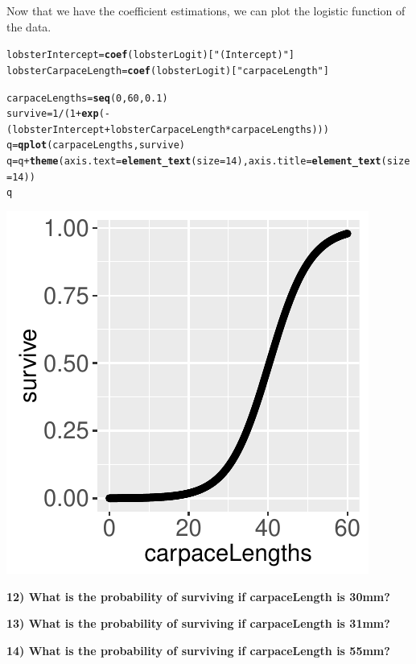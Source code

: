 \documentclass{article}\usepackage[]{graphicx}\usepackage[]{color}
\makeatletter
\newcommand{\hlnum}[1]{\textcolor[rgb]{0.686,0.059,0.569}{#1}}%
\newcommand{\hlstr}[1]{\textcolor[rgb]{0.192,0.494,0.8}{#1}}%
\newcommand{\hlopt}[1]{\textcolor[rgb]{0,0,0}{#1}}%
\newcommand{\hlstd}[1]{\textcolor[rgb]{0.345,0.345,0.345}{#1}}%
\newcommand{\hlkwb}[1]{\textcolor[rgb]{0.69,0.353,0.396}{#1}}%
\newcommand{\hlkwc}[1]{\textcolor[rgb]{0.333,0.667,0.333}{#1}}%
\newcommand{\hlkwd}[1]{\textcolor[rgb]{0.737,0.353,0.396}{\textbf{#1}}}%
\newenvironment{kframe}{%
 \def\at@end@of@kframe{}%
 \ifinner\ifhmode%
  \def\at@end@of@kframe{\end{minipage}}%
  \begin{minipage}{\columnwidth}%
 \fi\fi%
 \def\FrameCommand##1{\hskip\@totalleftmargin \hskip-\fboxsep
 \colorbox{shadecolor}{##1}\hskip-\fboxsep
     \hskip-\linewidth \hskip-\@totalleftmargin \hskip\columnwidth}%
 \MakeFramed {\advance\hsize-\width
   \@totalleftmargin\z@ \linewidth\hsize
   \@setminipage}}%
 {\par\unskip\endMakeFramed%
 \at@end@of@kframe}
\newenvironment{knitrout}{}{} %
\makeatother
\begin{document}
Now that we have the coefficient estimations, we can plot the logistic function of the data.

\begin{knitrout}
\color{fgcolor}\begin{kframe}
\begin{alltt}
\hlstd{lobsterIntercept} \hlkwb{=} \hlkwd{coef}\hlstd{(lobsterLogit)[}\hlstr{"(Intercept)"}\hlstd{]}
\hlstd{lobsterCarpaceLength} \hlkwb{=} \hlkwd{coef}\hlstd{(lobsterLogit)[}\hlstr{"carpaceLength"}\hlstd{]}

\hlstd{carpaceLengths} \hlkwb{=} \hlkwd{seq}\hlstd{(}\hlnum{0}\hlstd{,}\hlnum{60}\hlstd{,}\hlnum{0.1}\hlstd{)}
\hlstd{survive} \hlkwb{=} \hlnum{1}\hlopt{/}\hlstd{(}\hlnum{1}\hlopt{+}\hlkwd{exp}\hlstd{(}\hlopt{-}\hlstd{(lobsterIntercept}\hlopt{+}\hlstd{lobsterCarpaceLength}\hlopt{*}\hlstd{carpaceLengths)))}
\hlstd{q} \hlkwb{=} \hlkwd{qplot}\hlstd{(carpaceLengths,survive)}
\hlstd{q} \hlkwb{=} \hlstd{q} \hlopt{+} \hlkwd{theme}\hlstd{(}\hlkwc{axis.text}\hlstd{=}\hlkwd{element_text}\hlstd{(}\hlkwc{size}\hlstd{=}\hlnum{14}\hlstd{),} \hlkwc{axis.title}\hlstd{=}\hlkwd{element_text}\hlstd{(}\hlkwc{size}\hlstd{=}\hlnum{14}\hlstd{))}
\hlstd{q}
\end{alltt}
\end{kframe}
\includegraphics[width=.3\linewidth]{figure/unnamed-chunk-8-1} 

\end{knitrout}

\vspace{5mm}

\textbf{12) What is the probability of surviving if carpaceLength is 30mm?}

\vspace{20mm}

\textbf{13) What is the probability of surviving if carpaceLength is 31mm?}

\vspace{20mm}

\textbf{14) What is the probability of surviving if carpaceLength is 55mm?}
\end{document}
